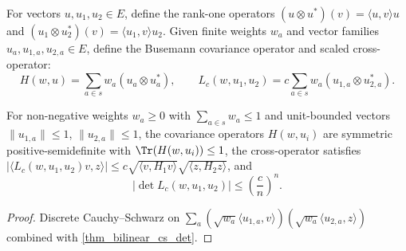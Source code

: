 \begin{definition}
\label{def_busemann_operators}
\leanok
For vectors $u, u_1, u_2 \in E$, define the rank-one operators $(u \otimes u^*)(v) = \langle u, v\rangle u$ and $(u_1 \otimes u_2^*)(v) = \langle u_1, v\rangle u_2$. Given finite weights $w_a$ and vector families $u_a, u_{1,a}, u_{2,a} \in E$, define the Busemann covariance operator and scaled cross-operator:
$$H(w, u) = \sum_{a \in s} w_a (u_a \otimes u_a^*), \qquad L_c(w, u_1, u_2) = c \sum_{a \in s} w_a (u_{1,a} \otimes u_{2,a}^*).$$
\end{definition}

\begin{theorem}
\label{thm_busemann_cross_det}
\leanok
{}
For non-negative weights $w_a \ge 0$ with $\sum_{a \in s} w_a \le 1$ and unit-bounded vectors $\|u_{1,a}\| \le 1$, $\|u_{2,a}\| \le 1$, the covariance operators $H(w, u_i)$ are symmetric positive-semidefinite with $\Tr(H(w, u_i)) \le 1$, the cross-operator satisfies $|\langle L_c(w, u_1, u_2) v, z\rangle| \le c \sqrt{\langle v, H_1 v\rangle}\sqrt{\langle z, H_2 z\rangle}$, and
$$|\det L_c(w, u_1, u_2)| \le \left(\frac{c}{n}\right)^n.$$
\end{theorem}
\begin{proof}\leanok Discrete Cauchy--Schwarz on $\sum_a (\sqrt{w_a}\langle u_{1,a}, v\rangle)(\sqrt{w_a}\langle u_{2,a}, z\rangle)$ combined with \cref{thm_bilinear_cs_det}.\end{proof}

